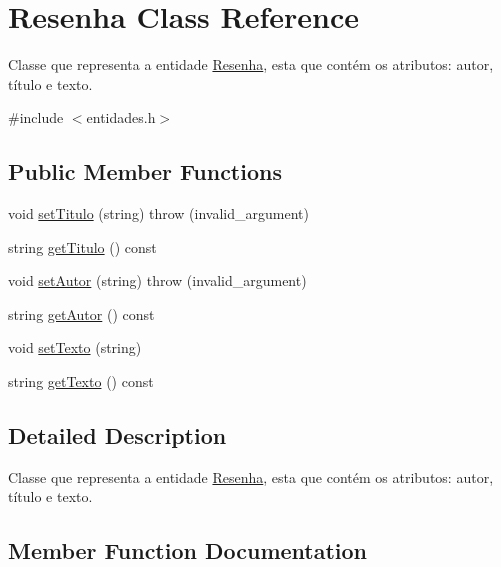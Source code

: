 \hypertarget{classResenha}{}\section{Resenha Class Reference}
\label{classResenha}


Classe que representa a entidade \hyperlink{classResenha}{Resenha}, esta que contém os atributos\+: autor, título e texto.  




{\ttfamily \#include $<$entidades.\+h$>$}

\subsection*{Public Member Functions}
\begin{DoxyCompactItemize}
\item 
void \hyperlink{classResenha_a4f2bf94388381e3ce05fe5d63ac23e4f}{set\+Titulo} (string)  throw (invalid\+\_\+argument)
\item 
string \hyperlink{classResenha_a8c0966bc51ba8d43c769594446797d9f}{get\+Titulo} () const
\item 
void \hyperlink{classResenha_a93b2d590fce3efecb9d1a2a5c1ab4ef1}{set\+Autor} (string)  throw (invalid\+\_\+argument)
\item 
string \hyperlink{classResenha_a9ba7b00c49de97e2c29caba9b229dfab}{get\+Autor} () const
\item 
void \hyperlink{classResenha_a6fd61b3ffeee4365aa8aaab69b16d41a}{set\+Texto} (string)
\item 
string \hyperlink{classResenha_a17b193d598f0b50f90310a67afc0b524}{get\+Texto} () const
\end{DoxyCompactItemize}


\subsection{Detailed Description}
Classe que representa a entidade \hyperlink{classResenha}{Resenha}, esta que contém os atributos\+: autor, título e texto. 

\subsection{Member Function Documentation}
\mbox{\label{classResenha_a9ba7b00c49de97e2c29caba9b229dfab}} 
